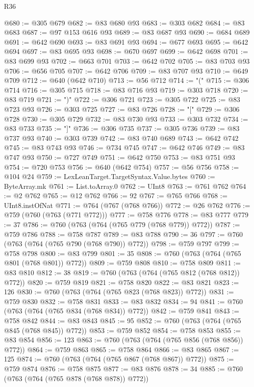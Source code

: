 \begin{lexlean}{R36}
\begin{coremodule}
@680 := @305 @679
@682 := @83 @680 @93
@683 := @303 @682
@684 := @83 @683
@687 := @97 @153 @616 @93
@689 := @83 @687 @93
@690 := @684 @689
@691 := @642 @690
@693 := @83 @691 @93
@694 := @677 @693
@695 := @642 @694
@697 := @83 @695 @93
@698 := @670 @697
@699 := @642 @698
@701 := @83 @699 @93
@702 := @663 @701
@703 := @642 @702
@705 := @83 @703 @93
@706 := @656 @705
@707 := @642 @706
@709 := @83 @707 @93
@710 := @649 @709
@712 := @640 (@642 @710)
@713 := @56 @712
@714 := "("
@715 := @306 @714
@716 := @305 @715
@718 := @83 @716 @93
@719 := @303 @718
@720 := @83 @719
@721 := ")"
@722 := @306 @721
@723 := @305 @722
@725 := @83 @723 @93
@726 := @303 @725
@727 := @83 @726
@728 := "["
@729 := @306 @728
@730 := @305 @729
@732 := @83 @730 @93
@733 := @303 @732
@734 := @83 @733
@735 := "]"
@736 := @306 @735
@737 := @305 @736
@739 := @83 @737 @93
@740 := @303 @739
@742 := @83 @740 @689
@743 := @642 @742
@745 := @83 @743 @93
@746 := @734 @745
@747 := @642 @746
@749 := @83 @747 @93
@750 := @727 @749
@751 := @642 @750
@753 := @83 @751 @93
@754 := @720 @753
@756 := @640 (@642 @754)
@757 := @56 @756
@758 := @104 @24
@759 := LexLeanTarget.TargetSyntax.Value.bytes
@760 := ByteArray.mk
@761 := List.toArray.{0}
@762 := UInt8
@763 := @761 @762
@764 := @2 @762
@765 := @12 @762
@766 := 92
@767 := @765 @766
@768 := UInt8.instOfNat
@771 := @764 (@767 (@768 @766))
@772 := @26 @762
@776 := @759 (@760 (@763 (@771 @772)))
@777 := @758 @776
@778 := @83 @777
@779 := 37
@786 := @760 (@763 (@764 (@765 @779 (@768 @779)) @772))
@787 := @759 @786
@788 := @758 @787
@789 := @83 @788
@790 := 36
@797 := @760 (@763 (@764 (@765 @790 (@768 @790)) @772))
@798 := @759 @797
@799 := @758 @798
@800 := @83 @799
@801 := 35
@808 := @760 (@763 (@764 (@765 @801 (@768 @801)) @772))
@809 := @759 @808
@810 := @758 @809
@811 := @83 @810
@812 := 38
@819 := @760 (@763 (@764 (@765 @812 (@768 @812)) @772))
@820 := @759 @819
@821 := @758 @820
@822 := @83 @821
@823 := 126
@830 := @760 (@763 (@764 (@765 @823 (@768 @823)) @772))
@831 := @759 @830
@832 := @758 @831
@833 := @83 @832
@834 := 94
@841 := @760 (@763 (@764 (@765 @834 (@768 @834)) @772))
@842 := @759 @841
@843 := @758 @842
@844 := @83 @843
@845 := 95
@852 := @760 (@763 (@764 (@765 @845 (@768 @845)) @772))
@853 := @759 @852
@854 := @758 @853
@855 := @83 @854
@856 := 123
@863 := @760 (@763 (@764 (@765 @856 (@768 @856)) @772))
@864 := @759 @863
@865 := @758 @864
@866 := @83 @865
@867 := 125
@874 := @760 (@763 (@764 (@765 @867 (@768 @867)) @772))
@875 := @759 @874
@876 := @758 @875
@877 := @83 @876
@878 := 34
@885 := @760 (@763 (@764 (@765 @878 (@768 @878)) @772))

\end{coremodule}
\end{lexlean}
